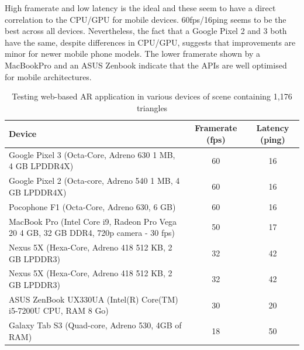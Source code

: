 \documentclass[acmlarge,screen,dvipsnames]{acmart}
\begin{document}
High framerate and low latency is the ideal and these seem to have a direct
correlation to the CPU/GPU for mobile devices. 60fps/16ping seems to be the
best across all devices. Nevertheless, the fact that a Google Pixel 2 and 3 both
have the same, despite differences in CPU/GPU, suggests that improvements are minor
for newer mobile phone models. The lower framerate shown by a MacBookPro
and an ASUS Zenbook indicate that the APIs are well optimised for mobile
architectures.


\begin{table}[h] \centering 
\begin{tabular}{|>{\centering\arraybackslash}p{8cm}|c|c|} 
\hline 
Device & Framerate (fps) & Latency (ping)\\  
\hline \hline 
Google Pixel 3 (Octa-Core, Adreno 630 1 MB, 4 GB LPDDR4X) &  60 & 16\\ 
\hline
 Google Pixel 2 (Octa-core,
Adreno 540 1 MB, 4 GB LPDDR4X)  &  60 & 16\\ 
\hline
Pocophone F1 (Octa-Core, Adreno 630, 6 GB) & 60 & 16 \\ 
\hline 
MacBook Pro
(Intel Core i9, Radeon Pro Vega 20 4 GB, 32 GB DDR4, 720p camera - 30 fps)  &
50 & 17\\ 
\hline 
Nexus 5X (Hexa-Core, Adreno 418 512 KB, 2 GB LPDDR3) & 32 &
42 \\ 
\hline  
Nexus 5X (Hexa-Core, Adreno 418 512 KB, 2 GB LPDDR3) & 32 & 42
\\ 
\hline 
ASUS ZenBook UX330UA (Intel(R) Core(TM) i5-7200U CPU, RAM 8 Go) & 30
& 20\\ 
\hline 
Galaxy Tab S3 (Quad-core, Adreno 530, 4GB of RAM) & 18 & 50\\
\hline 
\end{tabular} 
 \caption{Testing web-based AR application in various
devices of scene containing 1,176 triangles} \label{table:framerates} 
\end{table}




\end{document}
